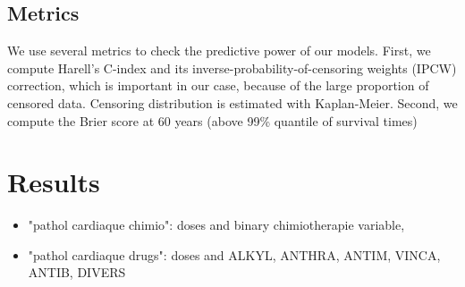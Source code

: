 \documentclass{article}
\begin{document}
\subsection{Metrics}

We use several metrics to check the predictive power of our models. First, we compute Harell's C-index and its inverse-probability-of-censoring weights (IPCW) correction, which is important in our case, because of the large proportion of censored data. Censoring distribution is estimated with Kaplan-Meier. 
Second, we compute the Brier score at 60 years (above 99\% quantile of survival times)

\section{Results}


\begin{itemize}
    \item "pathol cardiaque chimio": doses and binary chimiotherapie variable,
    \item "pathol cardiaque drugs": doses and ALKYL, ANTHRA, ANTIM, VINCA, ANTIB, DIVERS 
\end{itemize}
\end{document}
